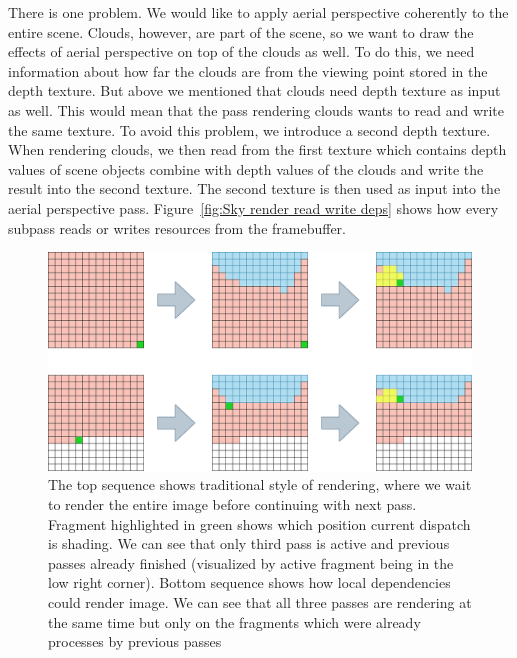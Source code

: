 \documentclass{ctuthesis}
\begin{document}
There is one problem. We would like to apply aerial perspective coherently to the entire scene. Clouds, however,
are part of the scene, so we want to draw the effects of aerial perspective on top of the clouds as well.
To do this, we need information about how far the clouds are from the viewing point stored
in the depth texture. But above we mentioned that clouds need depth texture as input as well. This would
mean that the pass rendering clouds wants to read and write the same texture. To avoid this problem,
we introduce a second depth texture. When rendering clouds, we then read from the first texture which contains depth
values of scene objects combine with depth values of the clouds and write the result into the second texture.
The second texture is then used as input into the aerial perspective pass. Figure~\ref{fig:Sky render read write deps}
shows how every subpass reads or writes resources from the framebuffer.

\begin{figure}
    \centering
    \includegraphics[width=1.0\textwidth]{media/Local_vs_global_dependencies.png}
    \caption[Local vs global dependencies]{The top sequence shows traditional style of rendering, where we wait to render
    the entire image before continuing with next pass. Fragment highlighted in green shows 
    which position current dispatch is shading. We can see that only third pass is active 
    and previous passes already finished (visualized by active fragment being in the low right corner). 
    Bottom sequence shows how local dependencies could render image. We can see that all three passes
    are rendering at the same time but only on the fragments which were already processes by previous
    passes}
    \label{fig:local vs global dependecies}
\end{figure}
\end{document}
